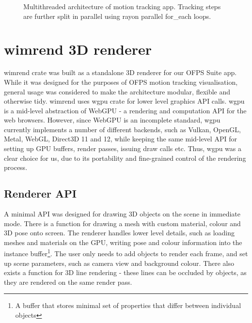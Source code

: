 \documentclass[11pt,english]{report}
\begin{document}
\begin{figure}[!ht]
	\caption{\centering Multithreaded architecture of motion tracking app. Tracking steps are further split in parallel using rayon parallel for\_each loops.}
\end{figure}

\section{wimrend 3D renderer}

wimrend crate was built as a standalone 3D renderer for our OFPS Suite app. While it was designed for the purposes of OFPS motion tracking visualisation, general usage was considered to make the architecture modular, flexible and otherwise tidy. wimrend uses wgpu crate for lower level graphics API calls. wgpu is a mid-level abstraction of WebGPU - a rendering and computation API for the web browsers\cite{webgpu}. However, since WebGPU is an incomplete standard, wgpu currently implements a number of different backends, such as Vulkan, OpenGL, Metal, WebGL, Direct3D 11 and 12, while keeping the same mid-level API for setting up GPU buffers, render passes, issuing draw calls etc. Thus, wgpu was a clear choice for us, due to its portability and fine-grained control of the rendering process.

\subsection{Renderer API}

A minimal API was designed for drawing 3D objects on the scene in immediate mode. There is a function for drawing a mesh with custom material, colour and 3D pose onto screen. The renderer handles lower level details, such as loading meshes and materials on the GPU, writing pose and colour information into the instance buffer\footnote{A buffer that stores minimal set of properties that differ between individual objects}. The user only needs to add objects to render each frame, and set up scene parameters, such as camera view and background colour. There also exists a function for 3D line rendering - these lines can be occluded by objects, as they are rendered on the same render pass.
\end{document}
